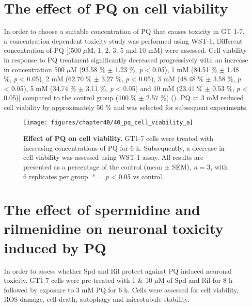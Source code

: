 \section{The effect of PQ on cell viability}
In order to choose a suitable concentration of PQ that causes toxicity in GT 1-7, a concentration dependent toxicity study was performed using WST-1. Different concentration of PQ [(500 $\mu$M, 1, 2, 3, 5 and 10 mM) were assessed. Cell viability in response to PQ treatment significantly decreased progressively with an increase in concentration 500 $\mu$M (93.58 \% $\pm$ 1.23 \%, \textit{p} < 0.05), 1 mM (84.51 \% $\pm$ 1.48 \%, \textit{p} < 0.05), 2 mM (62.70 \% $\pm$ 3.27 \%, \textit{p} < 0.05), 3 mM (48.48 \% $\pm$ 3.58 \%, \textit{p} < 0.05), 5 mM (34.74 \% $\pm$ 3.11 \%, \textit{p} < 0.05) and 10 mM (23.41 \% $\pm$ 0.53 \%, \textit{p} < 0.05)] compared to the control group (100 \% $\pm$ 2.57 \%) (). PQ at 3 mM reduced cell viability by approximately 50 \% and was selected for subsequent experiments.

\begin{figure}[!htbp]
\center
  \texttt{[image: figures/chapter40/40\_pq\_cell\_viability\_a]}
  \caption[Effect of PQ on cell viability]{\textbf{Effect of PQ on cell viability.} GT1-7 cells were treated with increasing concentrations of PQ for 6 h. Subsequently, a decrease in cell viability was assessed using WST-1 assay. All results are presented as a percentage of the control (mean $\pm$ SEM), \textit{n} = 3, with 6 replicates per group. * = \textit{p} < 0.05 vs control.}
  \label{fig:40_pq_cell_viability_a}
\end{figure} 

\section{The effect of spermidine and rilmenidine on neuronal toxicity induced by PQ}
In order to assess whether Spd and Ril protect against PQ induced neuronal toxicity, GT1-7 cells were pre-treated with 1 \& 10 $\mu$M of Spd and Ril for 8 h followed by exposure to 3 mM PQ for 6 h. Cells were assessed for cell viability, ROS damage, cell death, autophagy and microtubule stability.

